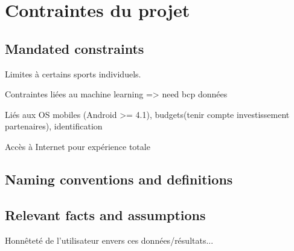 \chapter{Contraintes du projet}

\section{Mandated constraints}

Limites à certains sports individuels. 

Contraintes liées au machine learning => need bcp données

Liés aux OS mobiles (Android >= 4.1), budgets(tenir compte investissement partenaires), identification

Accès à Internet pour expérience totale

\section{Naming conventions and definitions}

\section{Relevant facts and assumptions}

Honnêteté de l'utilisateur envers ces données/résultats...